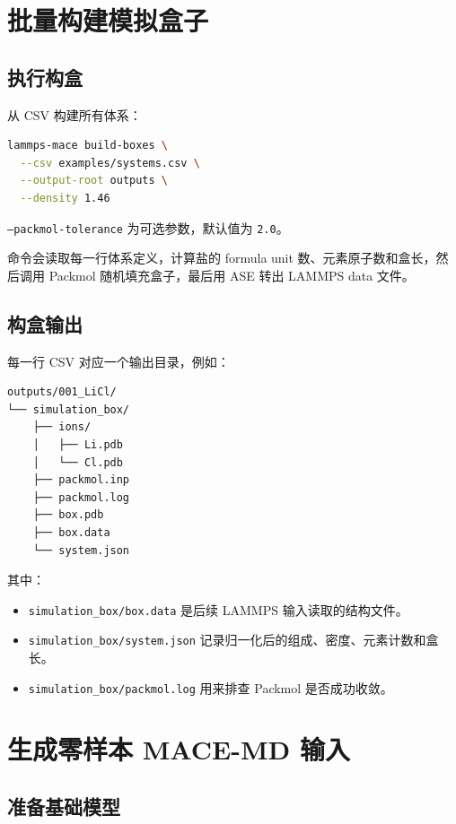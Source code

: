 \documentclass[11pt,a4paper]{article}
\begin{document}
\section{批量构建模拟盒子}

\subsection{执行构盒}

从 CSV 构建所有体系：

\begin{lstlisting}[language=bash]
lammps-mace build-boxes \
  --csv examples/systems.csv \
  --output-root outputs \
  --density 1.46
\end{lstlisting}

\texttt{--packmol-tolerance} 为可选参数，默认值为 \texttt{2.0}。

命令会读取每一行体系定义，计算盐的 formula unit 数、元素原子数和盒长，然后调用 Packmol 随机填充盒子，最后用 ASE 转出 LAMMPS data 文件。

\subsection{构盒输出}

每一行 CSV 对应一个输出目录，例如：

\begin{lstlisting}
outputs/001_LiCl/
└── simulation_box/
    ├── ions/
    │   ├── Li.pdb
    │   └── Cl.pdb
    ├── packmol.inp
    ├── packmol.log
    ├── box.pdb
    ├── box.data
    └── system.json
\end{lstlisting}

其中：

\begin{itemize}
  \item \texttt{simulation\_box/box.data} 是后续 LAMMPS 输入读取的结构文件。
  \item \texttt{simulation\_box/system.json} 记录归一化后的组成、密度、元素计数和盒长。
  \item \texttt{simulation\_box/packmol.log} 用来排查 Packmol 是否成功收敛。
\end{itemize}

\section{生成零样本 MACE-MD 输入}

\subsection{准备基础模型}
\end{document}
